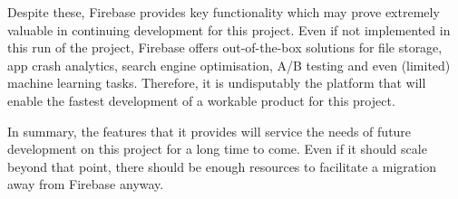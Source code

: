 Despite these, Firebase provides key functionality which may prove extremely valuable in continuing development for this project. Even if not implemented in this run of the project, Firebase offers out-of-the-box solutions for file storage, app crash analytics, search engine optimisation, A/B testing and even (limited) machine learning tasks. Therefore, it is undisputably the platform that will enable the fastest development of a workable product for this project.

In summary, the features that it provides will service the needs of future development on this project for a long time to come. Even if it should scale beyond that point, there should be enough resources to facilitate a migration away from Firebase anyway.

